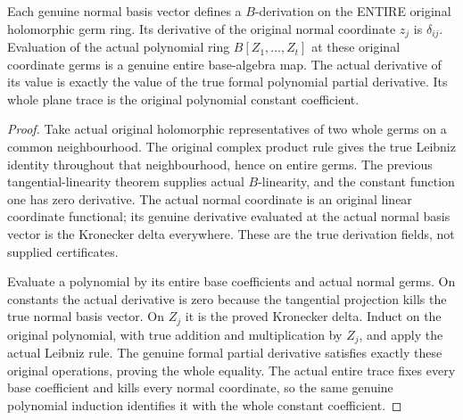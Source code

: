 \begin{lemma}
\label{hir:relative-normal-basis-actual-derivation-evaluation}
\leanok
Each genuine normal basis vector defines a $B$-derivation on the ENTIRE original
holomorphic germ ring. Its derivative of the original normal coordinate $z_j$
is $\delta_{ij}$. Evaluation of the actual polynomial ring $B[Z_1,\ldots,Z_t]$
at these original coordinate germs is a genuine entire base-algebra map.
The actual derivative of its value is exactly the value of the true formal
polynomial partial derivative. Its whole plane trace is the original
polynomial constant coefficient.
\end{lemma}
\begin{proof}
Take actual original holomorphic representatives of two whole germs on a
common neighbourhood. The original complex product rule gives the true
Leibniz identity throughout that neighbourhood, hence on entire germs. The
previous tangential-linearity theorem supplies actual $B$-linearity, and the
constant function one has zero derivative. The actual normal coordinate is
an original linear coordinate functional; its genuine derivative evaluated
at the actual normal basis vector is the Kronecker delta everywhere. These
are the true derivation fields, not supplied certificates.

Evaluate a polynomial by its entire base coefficients and actual normal
germs. On constants the actual derivative is zero because the tangential
projection kills the true normal basis vector. On $Z_j$ it is the proved
Kronecker delta. Induct on the original polynomial, with true addition and
multiplication by $Z_j$, and apply the actual Leibniz rule. The genuine formal
partial derivative satisfies exactly these original operations, proving the
whole equality. The actual entire trace fixes every base coefficient and
kills every normal coordinate, so the same genuine polynomial induction
identifies it with the whole constant coefficient.
\end{proof}

